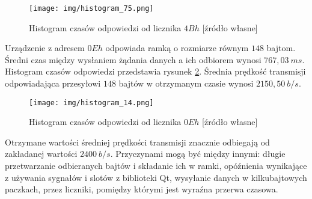 \begin{figure}[t]
	\centering
	\texttt{[image: img/histogram\_75.png]}
	\caption[Histogram czasów odpowiedzi od licznika $ 4Bh $]{Histogram czasów odpowiedzi od licznika $ 4Bh $ [źródło własne]}
	\label{fig:histogram_75}
\end{figure}

Urządzenie z adresem $ 0Eh $ odpowiada ramką o rozmiarze równym $ 148 $ bajtom.
Średni czas między wysłaniem żądania danych a ich odbiorem wynosi $ 767,03\ ms $.
Histogram czasów odpowiedzi przedstawia rysunek \ref{fig:histogram_14}.
Średnia prędkość transmisji odpowiadająca przesyłowi $ 148 $ bajtów w otrzymanym czasie wynosi $ 2150,50\ b/s $.

\begin{figure}[H]
	\centering
	\texttt{[image: img/histogram\_14.png]}
	\caption[Histogram czasów odpowiedzi od licznika $ 0Eh $]{Histogram czasów odpowiedzi od licznika $ 0Eh $ [źródło własne]}
	\label{fig:histogram_14}
\end{figure}

Otrzymane wartości średniej prędkości transmisji znacznie odbiegają od zakładanej wartości $ 2400\ b/s$.
Przyczynami mogą być między innymi: długie przetwarzanie odbieranych bajtów i składanie ich w ramki, opóźnienia wynikające z używania sygnałów i slotów z biblioteki Qt,
wysyłanie danych w kilkubajtowych paczkach, przez liczniki, pomiędzy którymi jest wyraźna przerwa czasowa.

